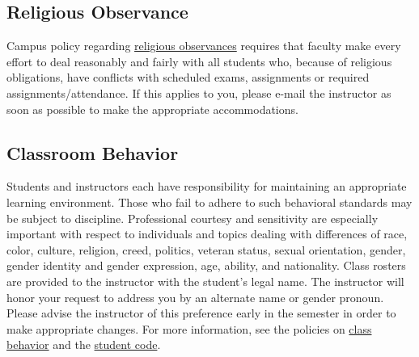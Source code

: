 \documentclass[10pt]{memoir}
\begin{document}
\subsection{Religious Observance}
Campus policy regarding \href{http://www.colorado.edu/policies/observance-religious-holidays-and-absences-classes-andor-exams}{religious observances} requires that faculty make every effort to deal reasonably and fairly with all students who, because of religious obligations, have conflicts with scheduled exams, assignments or required assignments/attendance. If this applies to you, please e-mail the instructor as soon as possible to make the appropriate accommodations.

\subsection{Classroom Behavior}
Students and instructors each have responsibility for maintaining an appropriate learning environment. Those who fail to adhere to such behavioral standards may be subject to discipline. Professional courtesy and sensitivity are especially important with respect to individuals and topics dealing with differences of race, color, culture, religion, creed, politics, veteran status, sexual orientation, gender, gender identity and gender expression, age, ability, and nationality. Class rosters are provided to the instructor with the student's legal name. The instructor will honor your request to address you by an alternate name or gender pronoun. Please advise the instructor of this preference early in the semester in order to make appropriate changes. For more information, see the policies on \href{http://www.colorado.edu/policies/student-classroom-and-course-related-behavior}{class behavior} and the \href{http://www.colorado.edu/osc/#student_code}{student code}.
\end{document}
